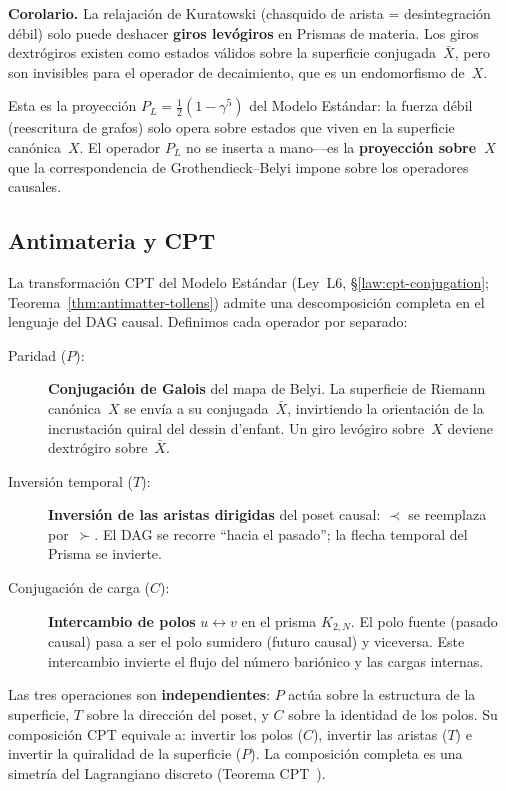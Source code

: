 \documentclass[11pt, a4paper, openany]{book}
\begin{document}
\smallskip\noindent\textbf{Corolario.}
La relajaci\'on de Kuratowski (chasquido de arista = desintegraci\'on
d\'ebil) solo puede deshacer \textbf{giros lev\'ogiros} en Prismas de
materia. Los giros dextr\'ogiros existen como estados v\'alidos sobre
la superficie conjugada~$\bar{X}$, pero son invisibles para el
operador de decaimiento, que es un endomorfismo de~$X$.
\smallskip

Esta es la proyecci\'on $P_L = \tfrac{1}{2}(1-\gamma^5)$ del Modelo
Est\'andar: la fuerza d\'ebil (reescritura de grafos) solo opera sobre
estados que viven en la superficie can\'onica~$X$. El operador $P_L$
no se inserta a mano---es la \textbf{proyecci\'on sobre~$X$} que la
correspondencia de Grothendieck--Belyi impone sobre los operadores
causales.

\subsection{Antimateria y CPT}

La transformaci\'on CPT del Modelo Est\'andar (Ley~L6,
\S\ref{law:cpt-conjugation}; Teorema~\ref{thm:antimatter-tollens})
admite una descomposici\'on completa en el lenguaje del DAG causal.
Definimos cada operador por separado:

\begin{description}
  \item[Paridad ($P$):] \textbf{Conjugaci\'on de Galois} del mapa de
    Belyi. La superficie de Riemann can\'onica~$X$ se env\'ia a su
    conjugada~$\bar{X}$, invirtiendo la orientaci\'on de la
    incrustaci\'on quiral del dessin d'enfant. Un giro lev\'ogiro
    sobre~$X$ deviene dextr\'ogiro sobre~$\bar{X}$.
  \item[Inversi\'on temporal ($T$):] \textbf{Inversi\'on de las aristas
    dirigidas} del poset causal: $\prec$ se reemplaza por~$\succ$.
    El DAG se recorre ``hacia el pasado''; la flecha temporal del
    Prisma se invierte.
  \item[Conjugaci\'on de carga ($C$):] \textbf{Intercambio de polos}
    $u \leftrightarrow v$ en el prisma $K_{2,N}$. El polo fuente
    (pasado causal) pasa a ser el polo sumidero (futuro causal) y
    viceversa. Este intercambio invierte el flujo del n\'umero bari\'onico
    y las cargas internas.
\end{description}

Las tres operaciones son \textbf{independientes}: $P$ act\'ua sobre la
estructura de la superficie, $T$ sobre la direcci\'on del poset, y $C$
sobre la identidad de los polos. Su composici\'on CPT equivale a:
invertir los polos ($C$), invertir las aristas ($T$) e invertir la
quiralidad de la superficie ($P$). La composici\'on completa es una
simetr\'ia del Lagrangiano discreto (Teorema
CPT~\cite{luders1954,pauli1955}).
\end{document}
